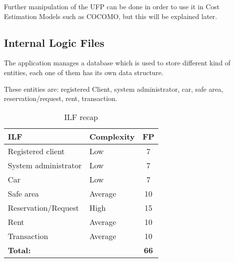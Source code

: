 Further manipulation of the UFP can be done in order to use it in Cost Estimation Models such as COCOMO, but this will be explained later.

\subsection{Internal Logic Files}
The application manages a database which is used to store different kind of entities, each one of them has its own data structure.

These entities are: registered Client, system administrator, car, safe area, reservation/request, rent, transaction.

\begin{table}[!h]
\centering
\caption{ILF recap}
\label{itl}
\begin{tabularx}{\linewidth}{XXc}
\hline
ILF                       & Complexity & FP \\ \hline
Registered client         & Low        & 7 \\
System administrator      & Low        & 7   \\
Car                       & Low        & 7  \\
Safe area                 & Average    & 10  \\
Reservation/Request       & High       & 15   \\
Rent                      & Average    & 10 \\
Transaction               & Average    & 10 \\ \hline
\textbf{Total:}           &            & \textbf{66}
\end{tabularx}
\end{table}
